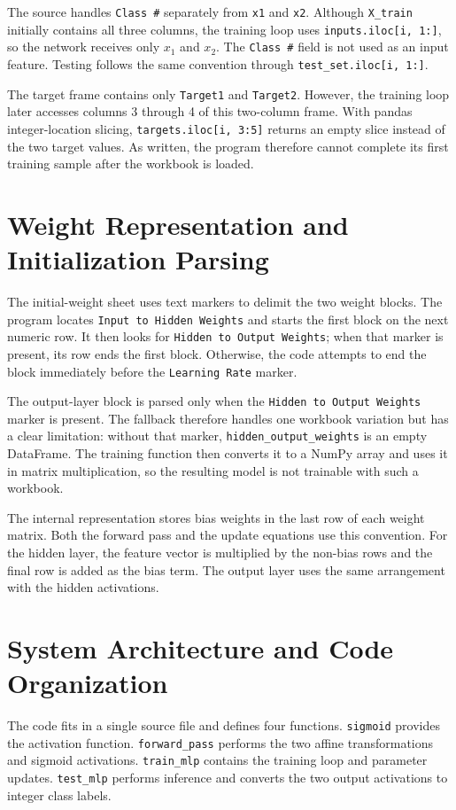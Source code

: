 \documentclass[11pt,a4paper]{article}
\newcommand{\code}[1]{\texttt{\small #1}}
\begin{document}
The source handles \code{Class \#} separately from \code{x1} and \code{x2}. Although \code{X\_train} initially contains all three columns, the training loop uses \code{inputs.iloc[i, 1:]}, so the network receives only \(x_1\) and \(x_2\). The \code{Class \#} field is not used as an input feature. Testing follows the same convention through \code{test\_set.iloc[i, 1:]}.

The target frame contains only \code{Target1} and \code{Target2}. However, the training loop later accesses columns 3 through 4 of this two-column frame. With pandas integer-location slicing, \code{targets.iloc[i, 3:5]} returns an empty slice instead of the two target values. As written, the program therefore cannot complete its first training sample after the workbook is loaded.

\section{Weight Representation and Initialization Parsing}
The initial-weight sheet uses text markers to delimit the two weight blocks. The program locates \code{Input to Hidden Weights} and starts the first block on the next numeric row. It then looks for \code{Hidden to Output Weights}; when that marker is present, its row ends the first block. Otherwise, the code attempts to end the block immediately before the \code{Learning Rate} marker.

The output-layer block is parsed only when the \code{Hidden to Output Weights} marker is present. The fallback therefore handles one workbook variation but has a clear limitation: without that marker, \code{hidden\_output\_weights} is an empty DataFrame. The training function then converts it to a NumPy array and uses it in matrix multiplication, so the resulting model is not trainable with such a workbook.

The internal representation stores bias weights in the last row of each weight matrix. Both the forward pass and the update equations use this convention. For the hidden layer, the feature vector is multiplied by the non-bias rows and the final row is added as the bias term. The output layer uses the same arrangement with the hidden activations.

\section{System Architecture and Code Organization}
The code fits in a single source file and defines four functions. \code{sigmoid} provides the activation function. \code{forward\_pass} performs the two affine transformations and sigmoid activations. \code{train\_mlp} contains the training loop and parameter updates. \code{test\_mlp} performs inference and converts the two output activations to integer class labels.
\end{document}
